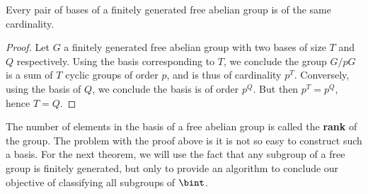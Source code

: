 \begin{corollary}
    Every pair of bases of a finitely generated free abelian group is of the same cardinality.
\end{corollary}
\begin{proof}
    Let $G$ a finitely generated free abelian group with two bases of size $T$ and $Q$ respectively. Using the basis corresponding to $T$, we conclude the group $G/pG$ is a sum of $T$ cyclic groups of order $p$, and is thus of cardinality $p^T$. Conversely, using the basis of $Q$, we conclude the basis is of order $p^Q$. But then $p^T = p^Q$, hence $T = Q$.
\end{proof}

The number of elements in the basis of a free abelian group is called the {\bf rank} of the group. The problem with the proof above is it is not so easy to construct such a basis. For the next theorem, we will use the fact that any subgroup of a free group is finitely generated, but only to provide an algorithm to conclude our objective of classifying all subgroups of $\bint$.


